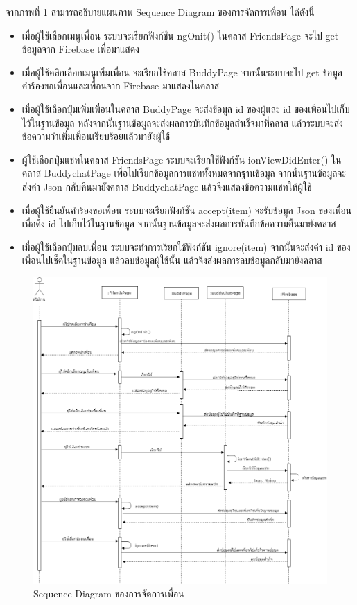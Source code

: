 	จากภาพที่ \ref{Fig:Sequence-friend} สามารถอธิบายแผนภาพ Sequence Diagram ของการจัดการเพื่อน ได้ดังนี้ 
	\begin{itemize}
		\item เมื่อผู้ใช้เลือกเมนูเพื่อน ระบบจะเรียกฟังก์ชัน ngOnit() ในคลาส FriendsPage จะไป get ข้อมูลจาก Firebase เพื่อมาแสดง
		\item เมื่อผู้ใช้คลิกเลือกเมนูเพิ่มเพื่อน จะเรียกใช้คลาส BuddyPage จากนั้นระบบจะไป get ข้อมูลคำร้องขอเพื่อนและเพื่อนจาก Firebase มาแสดงในคลาส 
		\item เมื่อผู้ใช้เลือกปุ่มเพิ่มเพื่อนในคลาส BuddyPage จะส่งข้อมูล id ของผู้และ id ของเพื่อนไปเก็บไว้ในฐานข้อมูล หลังจากนั้นฐานข้อมูลจะส่งผลการบันทึกข้อมูลสำเร็จมาที่คลาส แล้วระบบจะส่งข้อความว่าเพิ่มเพื่อนเรียบร้อยแล้วมายังผู้ใช้
		\item ผู้ใช้เลือกปุ่มแชทในคลาส FriendsPage ระบบจะเรียกใช้ฟังก์ชัน ionViewDidEnter() ในคลาส BuddychatPage เพื่อไปเรียกข้อมูลการแชททั้งหมดจากฐานข้อมูล จากนั้นฐานข้อมูลจะส่งค่า Json กลับคืนมายังคลาส BuddychatPage แล้วจึงแสดงข้อความแชทให้ผู้ใช้
		\item เมื่อผู้ใช้ยืนยันคำร้องขอเพื่อน ระบบจะเรียกฟังก์ชัน accept(item) จะรับข้อมูล Json ของเพื่อนเพื่อดึง id ไปเก็บไว้ในฐานข้อมูล จากนั้นฐานข้อมูลจะส่งผลการบันทึกข้อความคืนมายังคลาส
		\item เมื่อผู้ใช้เลือกปุ่มลบเพื่อน ระบบจะทำการเรียกใช้ฟังก์ชัน ignore(item) จากนั้นจะส่งค่า id ของเพื่อนไปเช็คในฐานข้อมูล แล้วลบข้อมูลผู้ใช้นั้น แล้วจึงส่งผลการลบข้อมูลกลับมายังคลาส
		\end{itemize}
\newpage
	\begin{figure}[H]
		\centering
		\includegraphics[width=1.0\columnwidth]
		{Figures/3/Sequence/friend}
		\caption{Sequence Diagram ของการจัดการเพื่อน}
		\label{Fig:Sequence-friend}
	\end{figure}
	\newpage	 


